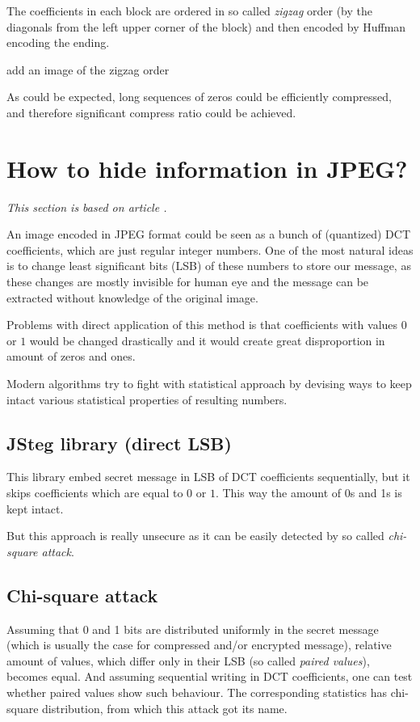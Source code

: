 The coefficients in each block are ordered in so called \emph{zigzag}
order (by the diagonals from the left upper corner of the block) and
then encoded by Huffman encoding \TODO the ending.

\TODO add an image of the zigzag order


As could be expected, long sequences of zeros could be efficiently
compressed, and therefore significant compress ratio could be achieved.


\section{How to hide information in JPEG?}
\label{sec:how-to-hide-information}

\textit{This section is based on article \cite{liu2008high}.}


An image encoded in JPEG format could be seen as a bunch of (quantized)
DCT coefficients, which are just regular integer numbers. One of the
most natural ideas is to change least significant bits (LSB) of these
numbers to store our message, as these changes are mostly invisible
for human eye and the message can be extracted without knowledge of
the original image.

Problems with direct application of this method is that coefficients with values
$0$ or $1$ would be changed drastically and it would create great disproportion
in amount of zeros and ones.

Modern algorithms try to fight with statistical approach by devising ways to
keep intact various statistical properties of resulting numbers. 

\subsection{JSteg library (direct LSB)}

This library embed secret message in LSB of DCT coefficients sequentially,
but it skips coefficients which are equal to $0$ or $1$. This way the amount
of 0s and 1s is kept intact.

But this approach is really unsecure as it can be easily detected by so called
\textit{chi-square attack}.

\subsection{Chi-square attack}

Assuming that 0 and 1 bits are distributed uniformly in the secret message 
(which is usually the case for compressed and/or encrypted message), relative
amount of values, which differ only in their LSB (so called \textit{paired values}),
becomes equal. And assuming sequential writing in DCT coefficients, one can test
whether paired values show such behaviour. The corresponding statistics has chi-square
distribution, from which this attack got its name.

